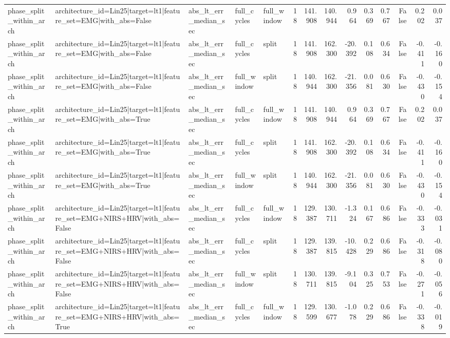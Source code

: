\begin{table}
\begin{tabular}{lllllrrrrrrrrr}
phase_split_within_arch & architecture_id=Lin25|target=lt1|feature_set=EMG|with_abs=False & abs_lt_err_median_sec & full_cycles & full_window & 18 & 141.908 & 140.944 & 0.964 & 0.369 & 0.767 & False & 0.202 & 0.037 \\
phase_split_within_arch & architecture_id=Lin25|target=lt1|feature_set=EMG|with_abs=False & abs_lt_err_median_sec & full_cycles & split & 18 & 141.908 & 162.300 & -20.392 & 0.108 & 0.634 & False & -0.411 & -0.160 \\
phase_split_within_arch & architecture_id=Lin25|target=lt1|feature_set=EMG|with_abs=False & abs_lt_err_median_sec & full_window & split & 18 & 140.944 & 162.300 & -21.356 & 0.081 & 0.630 & False & -0.430 & -0.154 \\
phase_split_within_arch & architecture_id=Lin25|target=lt1|feature_set=EMG|with_abs=True & abs_lt_err_median_sec & full_cycles & full_window & 18 & 141.908 & 140.944 & 0.964 & 0.369 & 0.767 & False & 0.202 & 0.037 \\
phase_split_within_arch & architecture_id=Lin25|target=lt1|feature_set=EMG|with_abs=True & abs_lt_err_median_sec & full_cycles & split & 18 & 141.908 & 162.300 & -20.392 & 0.108 & 0.634 & False & -0.411 & -0.160 \\
phase_split_within_arch & architecture_id=Lin25|target=lt1|feature_set=EMG|with_abs=True & abs_lt_err_median_sec & full_window & split & 18 & 140.944 & 162.300 & -21.356 & 0.081 & 0.630 & False & -0.430 & -0.154 \\
phase_split_within_arch & architecture_id=Lin25|target=lt1|feature_set=EMG+NIRS+HRV|with_abs=False & abs_lt_err_median_sec & full_cycles & full_window & 18 & 129.387 & 130.711 & -1.324 & 0.167 & 0.686 & False & -0.333 & -0.031 \\
phase_split_within_arch & architecture_id=Lin25|target=lt1|feature_set=EMG+NIRS+HRV|with_abs=False & abs_lt_err_median_sec & full_cycles & split & 18 & 129.387 & 139.815 & -10.428 & 0.229 & 0.686 & False & -0.318 & -0.080 \\
phase_split_within_arch & architecture_id=Lin25|target=lt1|feature_set=EMG+NIRS+HRV|with_abs=False & abs_lt_err_median_sec & full_window & split & 18 & 130.711 & 139.815 & -9.104 & 0.325 & 0.753 & False & -0.271 & -0.056 \\
phase_split_within_arch & architecture_id=Lin25|target=lt1|feature_set=EMG+NIRS+HRV|with_abs=True & abs_lt_err_median_sec & full_cycles & full_window & 18 & 129.599 & 130.677 & -1.078 & 0.229 & 0.686 & False & -0.338 & -0.019 \\

\end{tabular}
\end{table}
